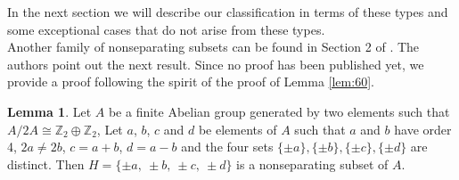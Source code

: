 \documentclass[article,dvisp]{amsart}
\def\Z{\mathbb{Z}}
\theoremstyle{definition}
\newtheorem{lem}[thm]{Lemma}
\theoremstyle{remark}
\numberwithin{equation}{section}
\theoremstyle{lemma}
\begin{document}
In the next section we will describe our classification in terms of these types and some exceptional cases that do not arise from these types.\\

\newpage
Another family of nonseparating subsets can be found in Section 2 of \cite{KLS}. The authors point out the next result. Since no proof has been published yet, we provide a proof following the spirit of the proof of Lemma \ref{lem:60}.

\begin{lem}\label{lem:600} Let $A$ be a finite Abelian group generated by two elements such that $A/2A \cong\Z_{2}\oplus \Z_{2}$, Let $a$, $b$, $c$ and $d$ be elements of $A$ such that $a$ and $b$ have order 4, $2a\neq2b$, $c=a+b$, $d=a-b$ and the four sets $\{\pm a\}, \{\pm b\}, \{\pm c\}, \{\pm d\}$ are distinct. Then $H=\{\pm a,\ \pm b,\ \pm c ,\ \pm d \}$ is a nonseparating subset of $A$.\end{lem} 
\end{document}
